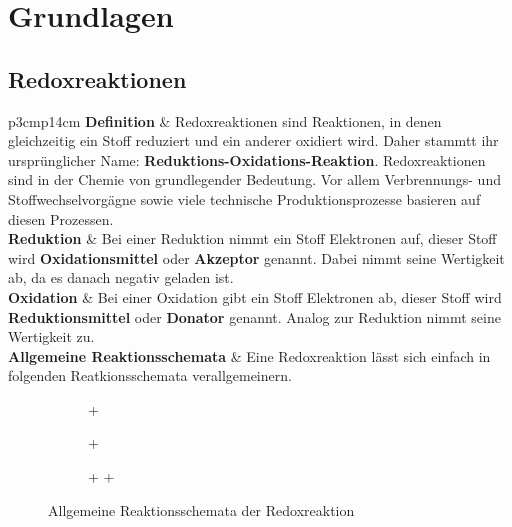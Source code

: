 \section{Grundlagen}

\subsection{Redoxreaktionen}
\begin{longtable}{p{3cm}p{14cm}}
	\textbf{Definition}
		& Redoxreaktionen sind Reaktionen, in denen gleichzeitig ein Stoff reduziert und ein anderer oxidiert wird. Daher stammtt ihr ursprünglicher Name: \textbf{Reduktions-Oxidations-Reaktion}. Redoxreaktionen sind in der Chemie von grundlegender Bedeutung. Vor allem Verbrennungs- und Stoffwechselvorgägne sowie viele technische Produktionsprozesse basieren auf diesen Prozessen.\\
	\hline
	\textbf{Reduktion}
		& Bei einer Reduktion nimmt ein Stoff Elektronen auf, dieser Stoff wird \textbf{Oxidationsmittel} oder \textbf{Akzeptor} genannt. Dabei nimmt seine Wertigkeit ab, da es danach negativ geladen ist.\\
	\hline
	\textbf{Oxidation}
		& Bei einer Oxidation gibt ein Stoff Elektronen ab, dieser Stoff wird \textbf{Reduktionsmittel} oder \textbf{Donator} genannt. Analog zur Reduktion nimmt seine Wertigkeit zu.\\
	\textbf{Allgemeine Reaktionsschemata}
		& Eine Redoxreaktion lässt sich einfach in folgenden Reatkionsschemata verallgemeinern.
\end{longtable}
\begin{figure}[H]\centering
	\begin{subfigure}[H]{0.5\linewidth}\centering
		 \chemrel{->}  + 
	\end{subfigure}
	
	\begin{subfigure}[H]{0.5\linewidth}\centering
		 +  \chemrel{->}   
	\end{subfigure}
	
	\begin{subfigure}[H]{0.5\linewidth}\centering
		 +  \chemrel{->}  +  
	\end{subfigure}
	\caption{Allgemeine Reaktionsschemata der Redoxreaktion}
\end{figure}

